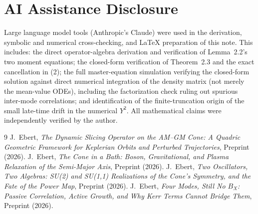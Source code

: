\documentclass[12pt]{amsart}
\theoremstyle{plain}
\theoremstyle{remark}
\begin{document}
\section*{AI Assistance Disclosure}

Large language model tools (Anthropic's Claude) were used in the derivation, symbolic and numerical cross-checking, and \LaTeX{} preparation of this note. This includes: the direct operator-algebra derivation and verification of Lemma~2.2's two moment equations; the closed-form verification of Theorem~2.3 and the exact cancellation in (2); the full master-equation simulation verifying the closed-form solution against direct numerical integration of the density matrix (not merely the mean-value ODEs), including the factorization check ruling out spurious inter-mode correlations; and identification of the finite-truncation origin of the small late-time drift in the numerical $Y^2$. All mathematical claims were independently verified by the author.

\begin{thebibliography}{9}
 J.~Ebert, \emph{The Dynamic Slicing Operator on the AM--GM Cone: A Quadric Geometric Framework for Keplerian Orbits and Perturbed Trajectories}, Preprint (2026).
 J.~Ebert, \emph{The Cone in a Bath: Boson, Gravitational, and Plasma Relaxation of the Semi-Major Axis}, Preprint (2026).
 J.~Ebert, \emph{Two Oscillators, Two Algebras: SU(2) and SU(1,1) Realizations of the Cone's Symmetry, and the Fate of the Power Map}, Preprint (2026).
 J.~Ebert, \emph{Four Modes, Still No $B_X$: Passive Correlation, Active Growth, and Why Kerr Terms Cannot Bridge Them}, Preprint (2026).
\end{thebibliography}
\end{document}
